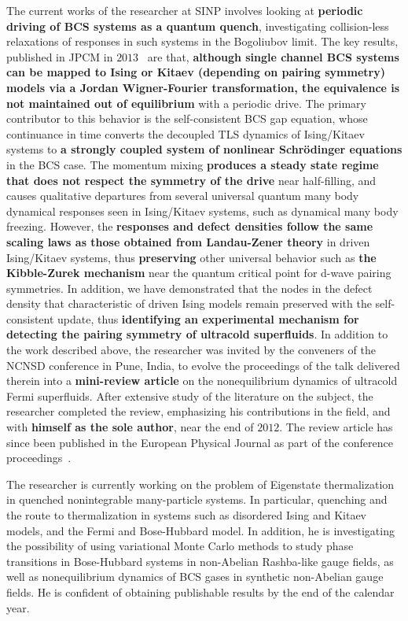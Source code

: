 \documentclass[a4paper,11pt,color]{article}
\begin{document}
The current works of the researcher at SINP involves looking at \textbf{periodic driving of BCS systems as a quantum quench}, investigating collision-less relaxations of responses in such systems in the Bogoliubov limit. The key results, published in JPCM in $2013$~\cite{fermidyn} are that, \textbf{although single channel BCS systems can be mapped to Ising or Kitaev (depending on pairing symmetry) models via a Jordan Wigner-Fourier transformation, the equivalence is not maintained out of equilibrium} with a periodic drive. The primary contributor to this behavior is the self-consistent BCS gap equation, whose continuance in time converts the decoupled TLS dynamics of Ising/Kitaev systems to \textbf{a strongly coupled system of nonlinear Schr\"odinger equations} in the BCS case. The momentum mixing \textbf{produces a steady state regime that does not respect the symmetry of the drive} near half-filling, and causes qualitative departures from several universal quantum many body dynamical responses seen in 
Ising/Kitaev systems, such as dynamical many body freezing. However, the \textbf{responses  and defect densities follow the same scaling laws as those obtained from Landau-Zener theory} in driven Ising/Kitaev systems, thus \textbf{preserving} other universal behavior such as \textbf{the Kibble-Zurek mechanism} near the quantum critical point for d-wave pairing symmetries. In addition, we have demonstrated that the nodes in the defect density that characteristic of driven Ising models remain preserved with the self-consistent update, thus \textbf{identifying an experimental mechanism for detecting the pairing symmetry of ultracold superfluids}. In addition to the work described above, the researcher was invited by the conveners of the NCNSD conference in Pune, India, to evolve the proceedings of the talk delivered therein into a \textbf{mini-review article} on the nonequilibrium dynamics of ultracold Fermi superfluids. After extensive study of the literature on the subject, the researcher completed the review, emphasizing his contributions in the field, and with \textbf{himself as the sole author}, near the end of $2012$. The review article has since been published in the European Physical Journal as part of the conference proceedings~\cite{ncnsd2012}.

The researcher is currently working on the problem of Eigenstate thermalization in quenched nonintegrable many-particle systems. In particular,  quenching and the route to thermalization in systems such as disordered Ising and Kitaev models, and the Fermi and Bose-Hubbard model. In addition, he is investigating the possibility of using variational Monte Carlo methods to study phase transitions in Bose-Hubbard systems in non-Abelian Rashba-like gauge fields, as well as nonequilibrium dynamics of BCS gases in synthetic non-Abelian gauge fields. He is confident of obtaining publishable results by the end of the calendar year.
\end{document}
